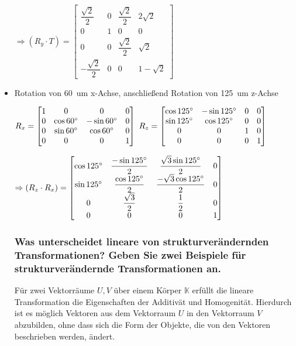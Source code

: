 \begin{itemize}
	$\Rightarrow (R_y \cdot T) = \begin{bmatrix}
		\dfrac{\sqrt{2}}{2} & 0 & \dfrac{\sqrt{2}}{2} & 2\sqrt{2}\\
		0 & 1 & 0 & 0\\
		0 & 0 & \dfrac{\sqrt{2}}{2} & \sqrt{2}\\
		-\dfrac{\sqrt{2}}{2} & 0 & 0 & 1-\sqrt2 
	\end{bmatrix}$
	
	\item Rotation von 60\degree\ um x-Achse, anschließend Rotation von 125\degree\ um z-Achse
	
	$
		R_x = \begin{bmatrix}
				1 & 0 & 0 & 0\\
				0 & \cos60\degree & -\sin60\degree & 0 \\
				0 & \sin60\degree & \cos60\degree &  0\\
				0 & 0 & 0 & 1
			 \end{bmatrix}
	$
	$
		R_z = \begin{bmatrix}
			\cos125\degree & -\sin125\degree & 0 & 0 \\
			\sin125\degree & \cos125\degree & 0 &0\\
			0 & 0 & 1 & 0\\
			0 & 0 & 0 & 1 
		\end{bmatrix}
	$

	
	$
	\Rightarrow (R_z \cdot R_x) = \begin{bmatrix}
	\cos125\degree & \dfrac{-\sin125\degree}{2} & \dfrac{\sqrt{3} \sin125\degree}{2} & 0\\
	\sin125\degree & \dfrac{\cos125\degree}{2} & \dfrac{-\sqrt{3} \cos125\degree}{2} & 0\\
	0& \dfrac{\sqrt{3}}{2}& \dfrac{1}{2}&0\\
	0& 0& 0& 1
	\end{bmatrix}
	$
\subsubsection{Was
	unterscheidet lineare von strukturverändernden Transformationen? Geben Sie zwei Beispiele für
	strukturverändernde Transformationen an.}


Für zwei Vektorräume  $U,V$ über einem Körper $\mathbb{K}$ erfüllt die lineare Transformation die Eigenschaften der Additivät und Homogenität. Hierdurch ist es möglich Vektoren aus dem Vektorraum $U$ in den Vektorraum $V$ abzubilden, ohne dass sich die Form der Objekte, die von den Vektoren beschrieben werden, ändert. 


\end{itemize}
